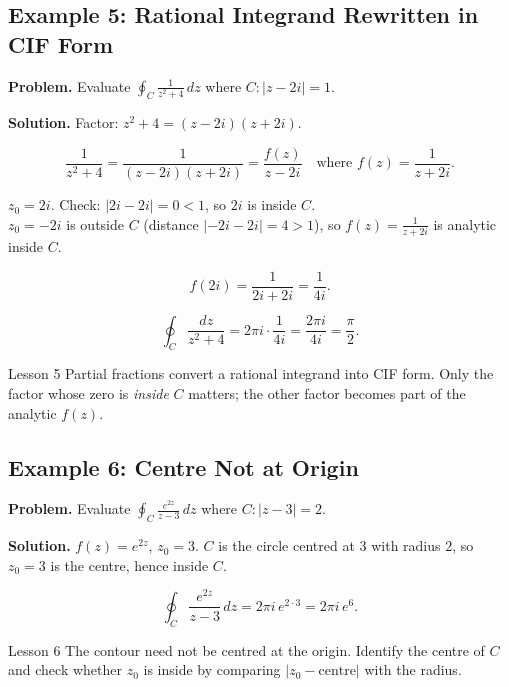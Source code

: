 \documentclass[12pt,a4paper]{article}
\begin{document}
\subsection*{Example 5: Rational Integrand Rewritten in CIF Form}

\textbf{Problem.} Evaluate $\displaystyle\oint_{C} \frac{1}{z^2 + 4}\,dz$
where $C: |z - 2i| = 1$.

\textbf{Solution.}
Factor: $z^2 + 4 = (z - 2i)(z + 2i)$.

\[
  \frac{1}{z^2+4} = \frac{1}{(z-2i)(z+2i)} = \frac{f(z)}{z - 2i}
  \quad \text{where } f(z) = \frac{1}{z + 2i}.
\]

$z_0 = 2i$. Check: $|2i - 2i| = 0 < 1$, so $2i$ is inside $C$. \\
$z_0 = -2i$ is outside $C$ (distance $|{-2i - 2i}| = 4 > 1$), so $f(z) = \frac{1}{z+2i}$ is analytic inside $C$.

\[
  f(2i) = \frac{1}{2i + 2i} = \frac{1}{4i}.
\]

\[
  \oint_{C} \frac{dz}{z^2+4} = 2\pi i \cdot \frac{1}{4i} = \frac{2\pi i}{4i} = \frac{\pi}{2}.
\]

\begin{learnbox}{Lesson 5}
Partial fractions convert a rational integrand into CIF form.
Only the factor whose zero is \emph{inside} $C$ matters; the other factor becomes part of the analytic $f(z)$.
\end{learnbox}

\subsection*{Example 6: Centre Not at Origin}

\textbf{Problem.} Evaluate $\displaystyle\oint_{C} \frac{e^{2z}}{z - 3}\,dz$
where $C: |z - 3| = 2$.

\textbf{Solution.}
$f(z) = e^{2z}$, $z_0 = 3$. $C$ is the circle centred at $3$ with radius $2$,
so $z_0 = 3$ is the centre, hence inside $C$.

\[
  \oint_{C} \frac{e^{2z}}{z-3}\,dz = 2\pi i\, e^{2 \cdot 3} = 2\pi i\, e^6.
\]

\begin{learnbox}{Lesson 6}
The contour need not be centred at the origin. Identify the centre of $C$ and
check whether $z_0$ is inside by comparing $|z_0 - \text{centre}|$ with the radius.
\end{learnbox}
\end{document}
